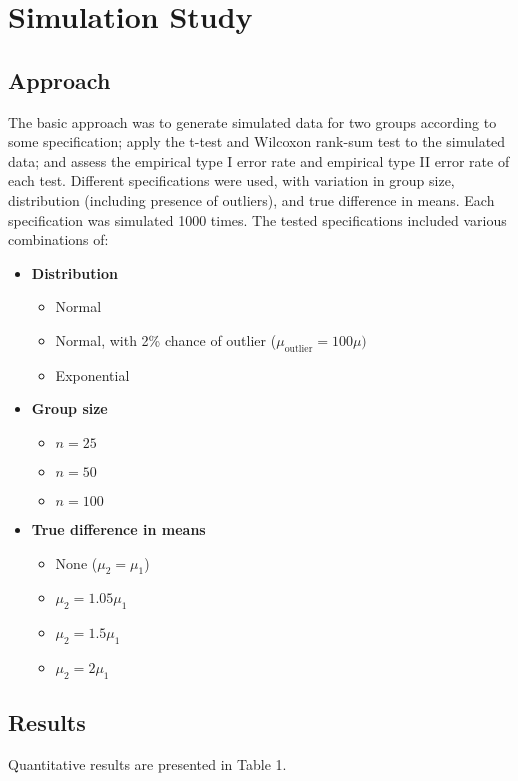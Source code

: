 \documentclass{report}
\begin{document}
\section*{Simulation Study}
\subsection*{Approach}
The basic approach was to generate simulated data for two
groups according to some specification; apply the t-test
and Wilcoxon rank-sum test to the simulated data; and assess the empirical type I error rate 
and empirical type II error rate of each
test. Different specifications were used, with variation in group
size, distribution (including presence of outliers), and true difference in
means. Each specification was simulated 1000 times. The tested specifications 
included various combinations of:

\begin{itemize}
	\item \textbf{Distribution}
		\begin{itemize}
			\item Normal
			\item Normal, with 2\% chance of outlier
				($\mu_{\mathrm{outlier}} = 100\mu)$
			\item Exponential
		\end{itemize}
	\item \textbf{Group size}
		\begin{itemize}
			\item $n=25$
			\item $n=50$
			\item $n=100$
		\end{itemize}
	\item \textbf{True difference in means}
		\begin{itemize}
			\item None ($\mu_2 = \mu_1$)
			\item $\mu_2 = 1.05\mu_1$
			\item $\mu_2 = 1.5\mu_1$
			\item $\mu_2 = 2\mu_1$
		\end{itemize}
\end{itemize}

\subsection*{Results}

Quantitative results are presented in Table 1. 
\end{document}
